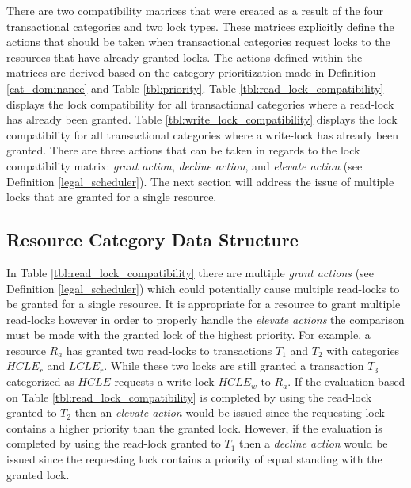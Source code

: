 \documentclass[conference]{IEEEtran}
\begin{document}
There are two compatibility matrices that were created as a result of the four transactional categories and two lock types. These matrices explicitly define the actions that should be taken when transactional categories request locks to the resources that have already granted locks. The actions defined within the matrices are derived based on the category prioritization made in Definition \ref{cat_dominance} and Table \ref{tbl:priority}. Table \ref{tbl:read_lock_compatibility} displays the lock compatibility for all transactional categories where a read-lock has already been granted. Table \ref{tbl:write_lock_compatibility} displays the lock compatibility for all transactional categories where a write-lock has already been granted. There are three actions that can be taken in regards to the lock compatibility matrix: \textit{grant action}, \textit{decline action}, and \textit{elevate action} (see Definition \ref{legal_scheduler}). The next section will address the issue of multiple locks that are granted for a single resource.

\subsection{Resource Category Data Structure}
\label{RCDS}

In Table \ref{tbl:read_lock_compatibility} there are multiple \textit{grant actions} (see Definition \ref{legal_scheduler}) which could potentially cause multiple read-locks to be granted for a single resource. It is appropriate for a resource to grant multiple read-locks however in order to properly handle the \textit{elevate actions} the comparison must be made with the granted lock of the highest priority. For example, a resource $R_{a}$ has granted two read-locks to transactions $T_{1}$ and $T_{2}$ with categories $HCLE_{r}$ and $LCLE_{r}$. While these two locks are still granted a transaction $T_{3}$ categorized as $HCLE$ requests a write-lock $HCLE_{w}$ to $R_{a}$. If the evaluation based on Table \ref{tbl:read_lock_compatibility} is completed by using the read-lock granted to $T_{2}$ then an \textit{elevate action} would be issued since the requesting lock contains a higher priority than the granted lock. However, if the evaluation is completed by using the read-lock granted to $T_{1}$ then a \textit{decline action} would be issued since the requesting lock contains a priority of equal standing with the granted lock.
\end{document}
